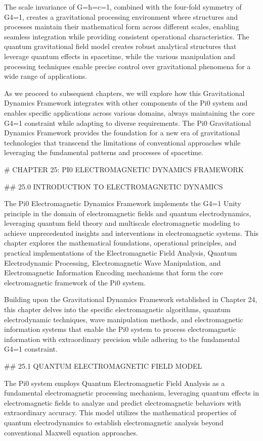 The scale invariance of G=ħ=c=1, combined with the four-fold symmetry of G4=1, creates a gravitational processing environment where structures and processes maintain their mathematical form across different scales, enabling seamless integration while providing consistent operational characteristics. The quantum gravitational field model creates robust analytical structures that leverage quantum effects in spacetime, while the various manipulation and processing techniques enable precise control over gravitational phenomena for a wide range of applications.

As we proceed to subsequent chapters, we will explore how this Gravitational Dynamics Framework integrates with other components of the Pi0 system and enables specific applications across various domains, always maintaining the core G4=1 constraint while adapting to diverse requirements. The Pi0 Gravitational Dynamics Framework provides the foundation for a new era of gravitational technologies that transcend the limitations of conventional approaches while leveraging the fundamental patterns and processes of spacetime.

# CHAPTER 25: PI0 ELECTROMAGNETIC DYNAMICS FRAMEWORK

## 25.0 INTRODUCTION TO ELECTROMAGNETIC DYNAMICS

The Pi0 Electromagnetic Dynamics Framework implements the G4=1 Unity principle in the domain of electromagnetic fields and quantum electrodynamics, leveraging quantum field theory and multiscale electromagnetic modeling to achieve unprecedented insights and interventions in electromagnetic systems. This chapter explores the mathematical foundations, operational principles, and practical implementations of the Electromagnetic Field Analysis, Quantum Electrodynamic Processing, Electromagnetic Wave Manipulation, and Electromagnetic Information Encoding mechanisms that form the core electromagnetic framework of the Pi0 system.

Building upon the Gravitational Dynamics Framework established in Chapter 24, this chapter delves into the specific electromagnetic algorithms, quantum electrodynamic techniques, wave manipulation methods, and electromagnetic information systems that enable the Pi0 system to process electromagnetic information with extraordinary precision while adhering to the fundamental G4=1 constraint.

## 25.1 QUANTUM ELECTROMAGNETIC FIELD MODEL

The Pi0 system employs Quantum Electromagnetic Field Analysis as a fundamental electromagnetic processing mechanism, leveraging quantum effects in electromagnetic fields to analyze and predict electromagnetic behaviors with extraordinary accuracy. This model utilizes the mathematical properties of quantum electrodynamics to establish electromagnetic analysis beyond conventional Maxwell equation approaches.

